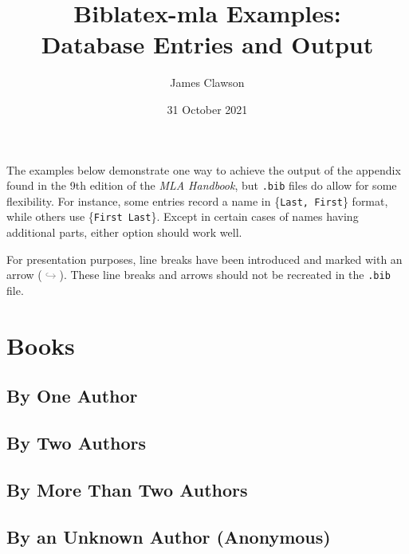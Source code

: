 \documentclass{article}
\title{Biblatex-mla Examples: \protect\\ Database Entries and Output}
\author{James Clawson}
\date{31 October 2021}
\begin{document}
\maketitle

\noindent{}The examples below demonstrate one way to achieve the output of the appendix found in the 9th edition of the \emph{MLA Handbook}, but \texttt{.bib} files do allow for some flexibility. For instance, some entries record a name in \{\texttt{Last, First}\} format, while others use \{\texttt{First Last}\}. Except in certain cases of names having additional parts, either option should work well. 

For presentation purposes, line breaks have been introduced and marked with an arrow (\textcolor{gray}{$\hookrightarrow$}). These line breaks and arrows should not be recreated in the \texttt{.bib} file.

\tableofcontents

\section{Books} %
\label{sec:books}

\subsection{By One Author} %
\label{ssub:by_one_author}
\begin{refsection}
	\printbibliography[heading=none]
\end{refsection}
\subsection{By Two Authors} %
\label{ssub:by_two_authors}
\begin{refsection}
	\printbibliography[heading=none]
\end{refsection}
\subsection{By More Than Two Authors} %
\label{ssub:by_more_than_two_authors}
\begin{refsection}
	\printbibliography[heading=none]
\end{refsection}
\subsection{By an Unknown Author (Anonymous)} %
\label{ssub:by_an_unknown_author_anonymous}
\begin{refsection}
	\printbibliography[heading=none]
\end{refsection}
\end{document}

